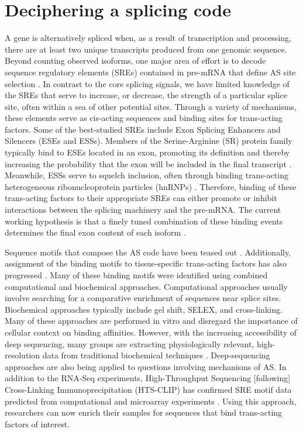 \section{Deciphering a splicing code}

A gene is alternatively spliced when, as a result of transcription and processing, there are at least two unique transcripts produced from one genomic sequence. Beyond counting observed isoforms, one major area of effort is to decode sequence regulatory elements (SREs) contained in pre-mRNA that define AS site selection \citep{Wang2008}. In contrast to the core splicing signals, we have limited knowledge of the SREs that serve to increase, or decrease, the strength of a particular splice site, often within a sea of other potential sites. Through a variety of mechanisms, these elements serve as cis-acting sequences and binding sites for trans-acting factors. Some of the best-studied SREs include Exon Splicing Enhancers and Silencers (ESEs and ESSs). Members of the Serine-Arginine (SR) protein family typically bind to ESEs located in an exon, promoting its definition and thereby increasing the probability that the exon will be included in the final transcript \citep{Graveley2000,Long2009}. Meanwhile, ESSs serve to squelch inclusion, often through binding trans-acting heterogeneous ribonucleoprotein particles (hnRNPs) \citep{Martinez-Contreras2007}. Therefore, binding of these trans-acting factors to their appropriate SREs can either promote or inhibit interactions between the splicing machinery and the pre-mRNA. The current working hypothesis is that a finely tuned combination of these binding events determines the final exon content of each isoform \citep{House2008}. 

Sequence motifs that compose the AS code have been teased out \citep{Ladd2002, Barash2010}. Additionally, assignment of the binding motifs to tissue-specific trans-acting factors has also progressed \citep{Jin2003,Ule2005,Licatalosi2008}. Many of these binding motifs were identified using combined computational and biochemical approaches. Computational approaches usually involve searching for a comparative enrichment of sequences near splice sites. Biochemical approaches typically include gel shift, SELEX, and cross-linking. Many of these approaches are performed in vitro and disregard the importance of cellular context on binding affinities. However, with the increasing accessibility of deep sequencing, many groups are extracting physiologically relevant, high-resolution data from traditional biochemical techniques \citep{Ingolia2009, Ingolia2011}. Deep-sequencing approaches are also being applied to questions involving mechanisms of AS. In addition to the RNA-Seq experiments, High-Throughput Sequencing [following] Cross-Linking Immunoprecipitation (HTS-CLIP) has confirmed SRE motif data predicted from computational and microarray experiments \citep{Licatalosi2008,Hafner2010}. Using this approach, researchers can now enrich their samples for sequences that bind trans-acting factors of interest. 

